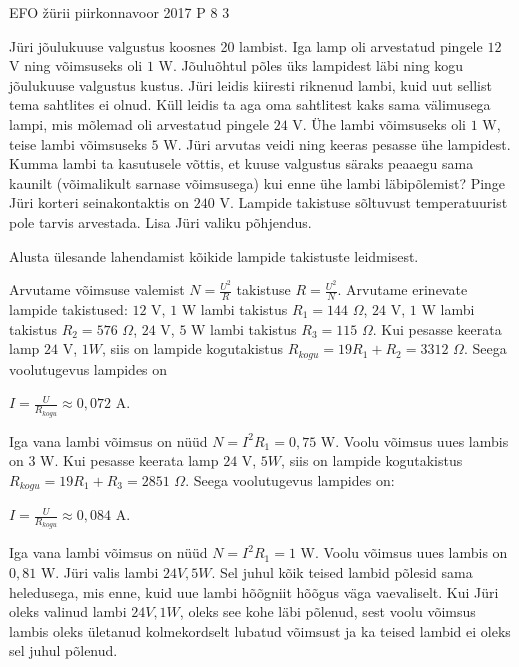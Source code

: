 {EFO žürii} %
{piirkonnavoor} %
{2017} %
{P 8} %
{3} %
{

\ifStatement
Jüri jõulukuuse valgustus koosnes 20 lambist. Iga lamp oli arvestatud pingele $12$ V ning võimsuseks oli $1$ W. Jõuluõhtul põles üks lampidest läbi ning kogu jõulukuuse valgustus kustus. Jüri leidis kiiresti riknenud lambi, kuid uut sellist tema sahtlites ei olnud. Küll leidis ta aga oma sahtlitest kaks sama välimusega lampi, mis mõlemad oli arvestatud pingele $24$ V. Ühe lambi võimsuseks oli $1$ W, teise lambi võimsuseks $5$ W. Jüri arvutas veidi ning keeras pesasse ühe lampidest. Kumma lambi ta kasutusele võttis, et kuuse valgustus säraks peaaegu sama kaunilt (võimalikult sarnase võimsusega) kui enne ühe lambi läbipõlemist? Pinge Jüri korteri seinakontaktis on $240$ V. Lampide takistuse sõltuvust temperatuurist pole tarvis arvestada. Lisa Jüri valiku põhjendus.
\fi

\ifHint
Alusta ülesande lahendamist kõikide lampide takistuste leidmisest.
\fi


\ifSolution
Arvutame võimsuse valemist $N = \frac{U^2}{R}$ takistuse $R = \frac{U^2}{N}$.
Arvutame erinevate lampide takistused:
\newline
$12$ V, $1$ W lambi takistus $R_1 = 144$ $\Omega$,
\newline
$24$ V, $1$ W lambi takistus $R_2 = 576$ $\Omega$,
\newline
$24$ V, $5$ W lambi takistus $R_3 = 115$ $\Omega$.
\newline
Kui pesasse keerata lamp $24$ V, $1 W$, siis on lampide kogutakistus $R_{kogu} = 19 R_1 + R_2 = 3312$ $\Omega$. Seega voolutugevus lampides on 
\begin{center}
$I = \frac{U}{R_{kogu}} \approx 0,072$ A.
\end{center}
Iga vana lambi võimsus on nüüd $N = I^2 R_1 = 0,75$ W.
Voolu võimsus uues lambis on $3$ W.
Kui pesasse keerata lamp $24$ V, $5 W$, siis on lampide kogutakistus $R_{kogu} = 19 R_1 + R_3 = 2851$ $\Omega$. Seega voolutugevus lampides on:
\begin{center}
$I = \frac{U}{R_{kogu}} \approx 0,084$ A.
\end{center}
Iga vana lambi võimsus on nüüd $N = I^2 R_1 = 1$ W.
Voolu võimsus uues lambis on $0,81$ W.
Jüri valis lambi $24V, 5W$. Sel juhul kõik teised lambid põlesid sama heledusega, mis enne, kuid uue lambi hõõgniit hõõgus väga vaevaliselt. Kui Jüri oleks valinud lambi  $24V, 1W$, oleks see kohe läbi põlenud, sest voolu võimsus lambis oleks ületanud kolmekordselt lubatud võimsust ja ka teised lambid ei oleks sel juhul põlenud.
\fi
}